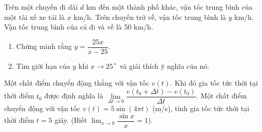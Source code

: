 \begin{bt}%
	Trên một chuyến đi dài $d$ km đến một thành phố khác, vận tốc trung bình của một tài xế xe tải là $x$ km/h. Trên chuyến trở về, vận tốc trung bình là $y$ km/h. Vận tốc trung bình của cả đi và về là 50 km/h.
	\begin{enumerate}
		\item Chứng minh rằng $y= \dfrac{25x}{x-25}$.
		\item Tìm giới hạn của $y$ khi $x \rightarrow 25^{+}$ và giải thích ý nghĩa của nó.
	\end{enumerate}
\end{bt}

\begin{bt}%
	Một chất điểm chuyển động thẳng với vận tốc $v(t)$. Khi đó gia tốc tức thời tại thời điểm $t_0$ được định nghĩa là $\displaystyle \lim \limits_{\Delta t \to 0} \dfrac{v(t_0+ \Delta t) - v(t_0)}{\Delta t}$. Một chất điểm chuyển động với vận tốc $v(t) = 5 \sin \left (4\pi t\right )$ (m/s), tính gia tốc tức thời tại thời điểm $t=5$ giây.  (Biết $\displaystyle \lim_{x \to 0} \dfrac{\sin x}{x} =1$). 
\end{bt}


